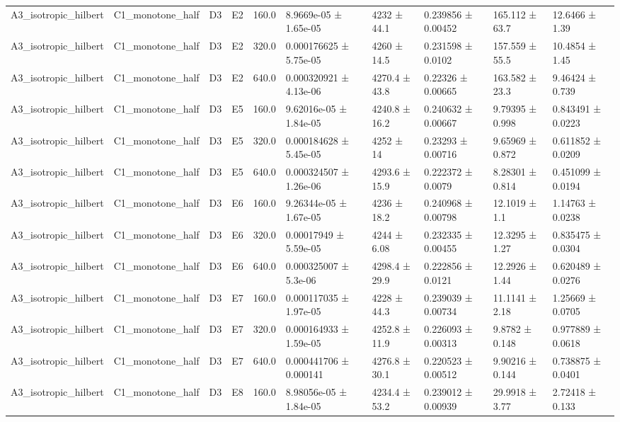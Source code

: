 \begin{table}
\begin{tabular}{llllllllll}
A3\_isotropic\_hilbert & C1\_monotone\_half & D3 & E2 & 160.0 & 8.9669e-05 ± 1.65e-05 & 4232 ± 44.1 & 0.239856 ± 0.00452 & 165.112 ± 63.7 & 12.6466 ± 1.39 \\
A3\_isotropic\_hilbert & C1\_monotone\_half & D3 & E2 & 320.0 & 0.000176625 ± 5.75e-05 & 4260 ± 14.5 & 0.231598 ± 0.0102 & 157.559 ± 55.5 & 10.4854 ± 1.45 \\
A3\_isotropic\_hilbert & C1\_monotone\_half & D3 & E2 & 640.0 & 0.000320921 ± 4.13e-06 & 4270.4 ± 43.8 & 0.22326 ± 0.00665 & 163.582 ± 23.3 & 9.46424 ± 0.739 \\
A3\_isotropic\_hilbert & C1\_monotone\_half & D3 & E5 & 160.0 & 9.62016e-05 ± 1.84e-05 & 4240.8 ± 16.2 & 0.240632 ± 0.00667 & 9.79395 ± 0.998 & 0.843491 ± 0.0223 \\
A3\_isotropic\_hilbert & C1\_monotone\_half & D3 & E5 & 320.0 & 0.000184628 ± 5.45e-05 & 4252 ± 14 & 0.23293 ± 0.00716 & 9.65969 ± 0.872 & 0.611852 ± 0.0209 \\
A3\_isotropic\_hilbert & C1\_monotone\_half & D3 & E5 & 640.0 & 0.000324507 ± 1.26e-06 & 4293.6 ± 15.9 & 0.222372 ± 0.0079 & 8.28301 ± 0.814 & 0.451099 ± 0.0194 \\
A3\_isotropic\_hilbert & C1\_monotone\_half & D3 & E6 & 160.0 & 9.26344e-05 ± 1.67e-05 & 4236 ± 18.2 & 0.240968 ± 0.00798 & 12.1019 ± 1.1 & 1.14763 ± 0.0238 \\
A3\_isotropic\_hilbert & C1\_monotone\_half & D3 & E6 & 320.0 & 0.00017949 ± 5.59e-05 & 4244 ± 6.08 & 0.232335 ± 0.00455 & 12.3295 ± 1.27 & 0.835475 ± 0.0304 \\
A3\_isotropic\_hilbert & C1\_monotone\_half & D3 & E6 & 640.0 & 0.000325007 ± 5.3e-06 & 4298.4 ± 29.9 & 0.222856 ± 0.0121 & 12.2926 ± 1.44 & 0.620489 ± 0.0276 \\
A3\_isotropic\_hilbert & C1\_monotone\_half & D3 & E7 & 160.0 & 0.000117035 ± 1.97e-05 & 4228 ± 44.3 & 0.239039 ± 0.00734 & 11.1141 ± 2.18 & 1.25669 ± 0.0705 \\
A3\_isotropic\_hilbert & C1\_monotone\_half & D3 & E7 & 320.0 & 0.000164933 ± 1.59e-05 & 4252.8 ± 11.9 & 0.226093 ± 0.00313 & 9.8782 ± 0.148 & 0.977889 ± 0.0618 \\
A3\_isotropic\_hilbert & C1\_monotone\_half & D3 & E7 & 640.0 & 0.000441706 ± 0.000141 & 4276.8 ± 30.1 & 0.220523 ± 0.00512 & 9.90216 ± 0.144 & 0.738875 ± 0.0401 \\
A3\_isotropic\_hilbert & C1\_monotone\_half & D3 & E8 & 160.0 & 8.98056e-05 ± 1.84e-05 & 4234.4 ± 53.2 & 0.239012 ± 0.00939 & 29.9918 ± 3.77 & 2.72418 ± 0.133 \\

\end{tabular}
\end{table}
